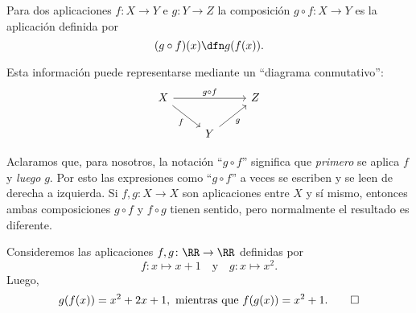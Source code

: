 \begin{definicion}
  \label{dfn:composicion-de-aplicaciones}
  Para dos aplicaciones $f\colon X\to Y$ e $g\colon Y\to Z$ la
  composición $g\circ f\colon X\to Y$ es la aplicación definida por
  $$(g\circ f) (x) \dfn g (f (x)).$$
\end{definicion}

Esta información puede representarse mediante un ``diagrama conmutativo'':
$$\begin{tikzcd}
X\ar{dr}[swap]{f}\ar{rr}{g\circ f} & & Z \\
 & Y \ar{ur}[swap]{g}
\end{tikzcd}$$

Aclaramos que, para nosotros, la notación ``$g\circ f$'' significa que
\emph{primero} se aplica $f$ y \emph{luego} $g$. Por esto las expresiones como
``$g\circ f$'' a veces se escriben y se leen de derecha a izquierda.
Si $f,g\colon X\to X$ son aplicaciones entre $X$ y sí mismo, entonces ambas
composiciones $g\circ f$ y $f\circ g$ tienen sentido, pero normalmente
el resultado es diferente.

\begin{ejemplo}
  Consideremos las aplicaciones $f,g\colon \RR\to \RR$ definidas por
  $$f\colon x\mapsto x+1 \quad\text{y}\quad g\colon x\mapsto x^2.$$
  Luego,
  \[ g (f (x)) = x^2 + 2x + 1, \text{ mientras que }f(g (x)) = x^2+1. \qedhere \]
\end{ejemplo}

